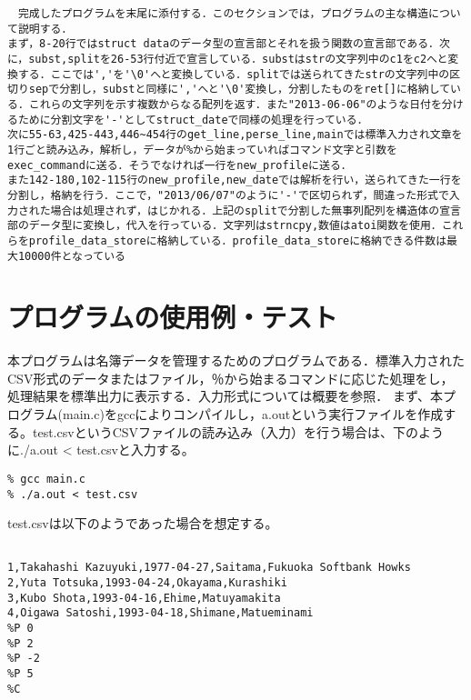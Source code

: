 \documentclass[a4j]{jarticle}
\begin{document}
\begin{verbatim}
　完成したプログラムを末尾に添付する．このセクションでは，プログラムの主な構造について説明する．
まず，8-20行ではstruct dataのデータ型の宣言部とそれを扱う関数の宣言部である．次に，subst,splitを26-53行付近で宣言している．substはstrの文字列中のc1をc2へと変換する．ここでは','を'\0'へと変換している．splitでは送られてきたstrの文字列中の区切りsepで分割し，substと同様に','へと'\0'変換し，分割したものをret[]に格納している．これらの文字列を示す複数からなる配列を返す．また"2013-06-06"のような日付を分けるために分割文字を'-'としてstruct_dateで同様の処理を行っている．
次に55-63,425-443,446~454行のget_line,perse_line,mainでは標準入力され文章を1行ごと読み込み，解析し，データが%から始まっていればコマンド文字と引数をexec_commandに送る．そうでなければ一行をnew_profileに送る．
また142-180,102-115行のnew_profile,new_dateでは解析を行い，送られてきた一行を分割し，格納を行う．ここで，"2013/06/07"のように'-'で区切られず，間違った形式で入力された場合は処理されず，はじかれる．上記のsplitで分割した無事列配列を構造体の宣言部のデータ型に変換し，代入を行っている．文字列はstrncpy,数値はatoi関数を使用．これらをprofile_data_storeに格納している．profile_data_storeに格納できる件数は最大10000件となっている

\end{verbatim}

%
%

\section{プログラムの使用例・テスト}

本プログラムは名簿データを管理するためのプログラムである．標準入力されたCSV形式のデータまたはファイル，％から始まるコマンドに応じた処理をし，処理結果を標準出力に表示する．入力形式については概要を参照．
まず、本プログラム(main.c)をgccによりコンパイルし，a.outという実行ファイルを作成する。test.csvというCSVファイルの読み込み（入力）を行う場合は、下のように./a.out < test.csvと入力する。

{\baselineskip 3mm
\begin{verbatim}
% gcc main.c
% ./a.out < test.csv
\end{verbatim}
}

test.csvは以下のようであった場合を想定する。

{\baselineskip 3mm
\begin{verbatim}

1,Takahashi Kazuyuki,1977-04-27,Saitama,Fukuoka Softbank Howks
2,Yuta Totsuka,1993-04-24,Okayama,Kurashiki
3,Kubo Shota,1993-04-16,Ehime,Matuyamakita
4,Oigawa Satoshi,1993-04-18,Shimane,Matueminami
%P 0
%P 2
%P -2
%P 5
%C
\end{verbatim}
}
\end{document}
